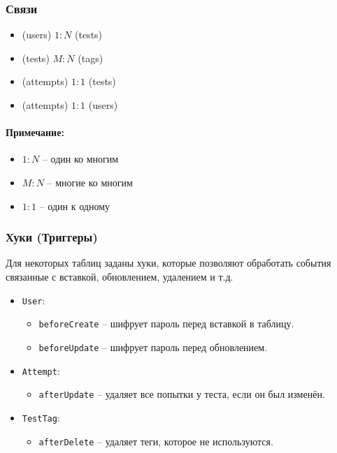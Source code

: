 \subsubsection{Связи}
\begin{itemize}
    \item (users) $1:N$ (tests)
    \item (tests) $M:N$ (tags)
    \item (attempts) $1:1$ (tests)
    \item (attempts) $1:1$ (users)
\end{itemize}
\paragraph{Примечание:}

\begin{itemize}
    \item $1:N$ -- один ко многим
    \item $M:N$ -- многие ко многим
    \item $1:1$ -- один к одному
\end{itemize}

\subsubsection{Хуки (Триггеры)}
Для некоторых таблиц заданы хуки, которые позволяют обработать события связанные с вставкой, обновлением, удалением и т.д.

\begin{itemize}
    \item \texttt{User}: \begin{itemize}
        \item \texttt{beforeCreate} -- шифрует пароль перед вставкой в таблицу.
        \item \texttt{beforeUpdate} -- шифрует пароль перед обновлением.
    \end{itemize}
    \item \texttt{Attempt}: \begin{itemize}
        \item \texttt{afterUpdate} -- удаляет все попытки у теста, если он был изменён.
    \end{itemize}
    \item \texttt{TestTag}: \begin{itemize}
        \item \texttt{afterDelete} -- удаляет теги, которое не используются.
    \end{itemize}
\end{itemize}

